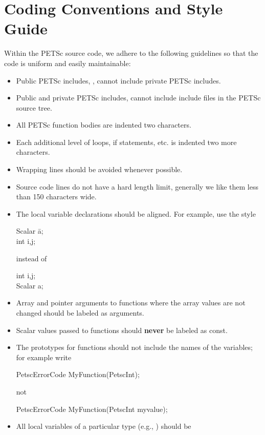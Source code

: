 \documentclass[twoside,12pt]{../sty/report_petsc}
\begin{document}
\section{Coding Conventions and Style Guide}

Within the PETSc source code, we adhere to the following guidelines
so that the code is uniform and easily maintainable:

\begin{itemize}
\item Public PETSc includes, , cannot include private PETSc  includes.
\item Public and private PETSc includes, cannot include include files in the PETSc source tree.
\item All PETSc function bodies are indented two characters.
\item Each additional level of loops, if statements, etc. is indented
      two more characters.
\item Wrapping lines should be avoided whenever possible.
\item Source code lines do not have a hard length limit, generally we like them less than 150 characters wide.
\item The local variable declarations should be aligned. For example,
      use the style
\begin{tabbing}
   Scalar \=a;\\
   int \>i,j;\\
\end{tabbing}
instead of
\begin{tabbing}
   int    i,j;\\
   Scalar a;
\end{tabbing}
\item Array and pointer arguments to functions where the array values are not changed should be labeled as  arguments.
\item Scalar values passed to functions should {\bf never} be labeled as const.
\item The prototypes for functions should not include the names of the variables; for example write
\begin{tabbing}
PetscErrorCode MyFunction(PetscInt);
\end{tabbing}
not
\begin{tabbing}
PetscErrorCode MyFunction(PetscInt myvalue);
\end{tabbing}
\item All local variables of a particular type (e.g., ) should be

\end{itemize}
\end{document}
